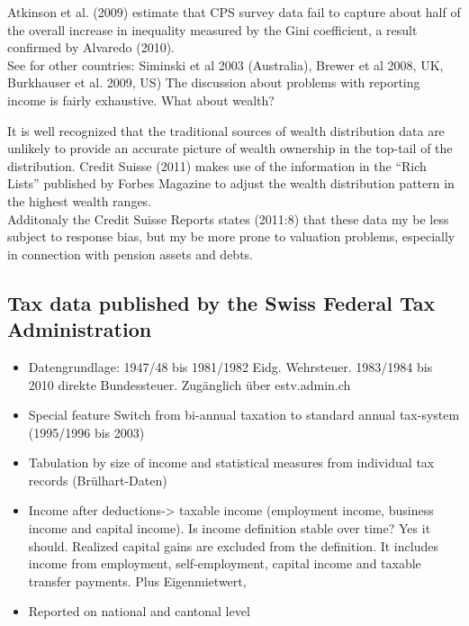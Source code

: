 \documentclass[twoside]{article}\usepackage[]{graphicx}\usepackage[]{color}
\begin{document}
\begin{multicols}{2}
Atkinson et al. (2009) estimate that CPS survey data fail to capture about half of the overall increase in inequality measured by the Gini coefficient, a result confirmed by Alvaredo (2010). \\

See for other countries: Siminski et al 2003 (Australia), Brewer et al 2008, UK, Burkhauser et al. 2009, US)
The discussion about problems with reporting income is fairly exhaustive. What about wealth?

It is well recognized that the traditional sources of wealth distribution data are unlikely to provide an accurate picture of wealth ownership in the top-tail of the distribution. Credit Suisse (2011) makes use of the information in the ``Rich Lists'' published by Forbes Magazine to adjust the wealth distribution pattern in the highest wealth ranges. \\

Additonaly the Credit Suisse Reports states (2011:8) that these data my be less subject to response bias, but my be more prone to valuation problems, especially in connection with pension assets and debts.

\subsection{Tax data published by the Swiss Federal Tax Administration}

\begin{itemize}
\item	Datengrundlage: 1947/48 bis 1981/1982 Eidg. Wehrsteuer. 1983/1984 bis 2010 direkte Bundessteuer. Zugänglich über estv.admin.ch
	\item	Special feature Switch from bi-annual taxation to standard annual tax-system (1995/1996 bis 2003)
	\item	Tabulation by size of income and statistical measures from individual tax records (Brülhart-Daten)
	\item	Income after deductions-> taxable income (employment income, business income and capital income). Is income definition stable over time? Yes it should. Realized capital gains are excluded from the definition. It includes income from  employment, self-employment, capital income and taxable transfer payments. Plus Eigenmietwert, 
	\item	Reported on national and cantonal level
\end{itemize}


\end{multicols}
\end{document}
